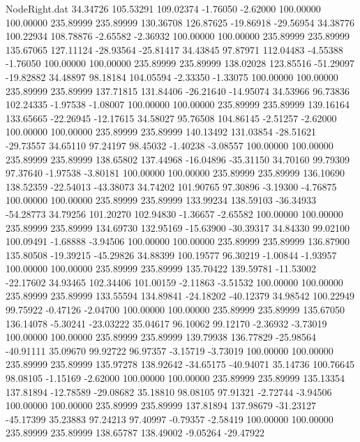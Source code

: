 \begin{filecontents}{NodeRight.dat}
  34.34726  105.53291  109.02374    -1.76050   -2.62000  100.00000  100.00000  235.89999  235.89999  130.36708  126.87625  -19.86918  -29.56954
  34.38776  100.22934  108.78876    -2.65582   -2.36932  100.00000  100.00000  235.89999  235.89999  135.67065  127.11124  -28.93564  -25.81417
  34.43845   97.87971  112.04483    -4.55388   -1.76050  100.00000  100.00000  235.89999  235.89999  138.02028  123.85516  -51.29097  -19.82882
  34.48897   98.18184  104.05594    -2.33350   -1.33075  100.00000  100.00000  235.89999  235.89999  137.71815  131.84406  -26.21640  -14.95074
  34.53966   96.73836  102.24335    -1.97538   -1.08007  100.00000  100.00000  235.89999  235.89999  139.16164  133.65665  -22.26945  -12.17615
  34.58027   95.76508  104.86145    -2.51257   -2.62000  100.00000  100.00000  235.89999  235.89999  140.13492  131.03854  -28.51621  -29.73557
  34.65110   97.24197   98.45032    -1.40238   -3.08557  100.00000  100.00000  235.89999  235.89999  138.65802  137.44968  -16.04896  -35.31150
  34.70160   99.79309   97.37640    -1.97538   -3.80181  100.00000  100.00000  235.89999  235.89999  136.10690  138.52359  -22.54013  -43.38073
  34.74202  101.90765   97.30896    -3.19300   -4.76875  100.00000  100.00000  235.89999  235.89999  133.99234  138.59103  -36.34933  -54.28773
  34.79256  101.20270  102.94830    -1.36657   -2.65582  100.00000  100.00000  235.89999  235.89999  134.69730  132.95169  -15.63900  -30.39317
  34.84330   99.02100  100.09491    -1.68888   -3.94506  100.00000  100.00000  235.89999  235.89999  136.87900  135.80508  -19.39215  -45.29826
  34.88399  100.19577   96.30219    -1.00844   -1.93957  100.00000  100.00000  235.89999  235.89999  135.70422  139.59781  -11.53002  -22.17602
  34.93465  102.34406  101.00159    -2.11863   -3.51532  100.00000  100.00000  235.89999  235.89999  133.55594  134.89841  -24.18202  -40.12379
  34.98542  100.22949   99.75922    -0.47126   -2.04700  100.00000  100.00000  235.89999  235.89999  135.67050  136.14078   -5.30241  -23.03222
  35.04617   96.10062   99.12170    -2.36932   -3.73019  100.00000  100.00000  235.89999  235.89999  139.79938  136.77829  -25.98564  -40.91111
  35.09670   99.92722   96.97357    -3.15719   -3.73019  100.00000  100.00000  235.89999  235.89999  135.97278  138.92642  -34.65175  -40.94071
  35.14736  100.76645   98.08105    -1.15169   -2.62000  100.00000  100.00000  235.89999  235.89999  135.13354  137.81894  -12.78589  -29.08682
  35.18810   98.08105   97.91321    -2.72744   -3.94506  100.00000  100.00000  235.89999  235.89999  137.81894  137.98679  -31.23127  -45.17399
  35.23883   97.24213   97.40997    -0.79357   -2.58419  100.00000  100.00000  235.89999  235.89999  138.65787  138.49002   -9.05264  -29.47922

\end{filecontents}
